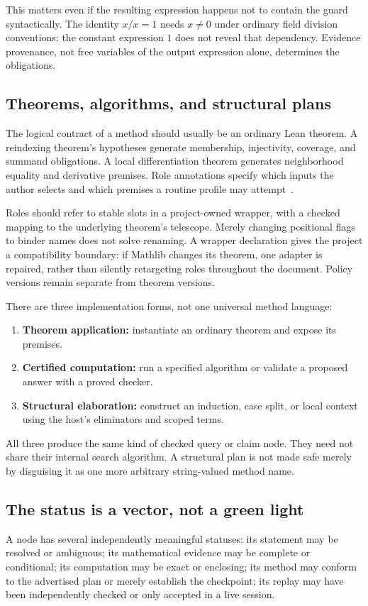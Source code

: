 \documentclass[11pt,a4paper]{article}
\theoremstyle{definition}
\begin{document}
This matters even if the resulting expression happens not to contain the guard syntactically. The identity \(x/x=1\) needs \(x\ne0\) under ordinary field division conventions; the constant expression \(1\) does not reveal that dependency. Evidence provenance, not free variables of the output expression alone, determines the obligations.

\subsection{Theorems, algorithms, and structural plans}
The logical contract of a method should usually be an ordinary Lean theorem. A reindexing theorem's hypotheses generate membership, injectivity, coverage, and summand obligations. A local differentiation theorem generates neighborhood equality and derivative premises. Role annotations specify which inputs the author selects and which premises a routine profile may attempt~\cite{synA,synB}.

Roles should refer to stable slots in a project-owned wrapper, with a checked mapping to the underlying theorem's telescope. Merely changing positional flags to binder names does not solve renaming. A wrapper declaration gives the project a compatibility boundary: if Mathlib changes its theorem, one adapter is repaired, rather than silently retargeting roles throughout the document. Policy versions remain separate from theorem versions.

There are three implementation forms, not one universal method language:
\begin{enumerate}
\item \textbf{Theorem application:} instantiate an ordinary theorem and expose its premises.
\item \textbf{Certified computation:} run a specified algorithm or validate a proposed answer with a proved checker.
\item \textbf{Structural elaboration:} construct an induction, case split, or local context using the host's eliminators and scoped terms.
\end{enumerate}
All three produce the same kind of checked query or claim node. They need not share their internal search algorithm. A structural plan is not made safe merely by disguising it as one more arbitrary string-valued method name.

\subsection{The status is a vector, not a green light}
A node has several independently meaningful statuses: its statement may be resolved or ambiguous; its mathematical evidence may be complete or conditional; its computation may be exact or enclosing; its method may conform to the advertised plan or merely establish the checkpoint; its replay may have been independently checked or only accepted in a live session.
\end{document}
